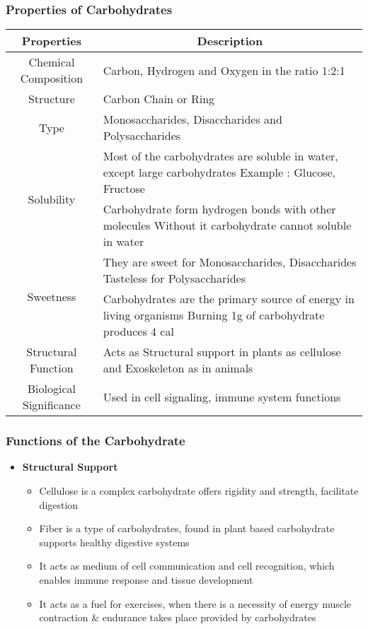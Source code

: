 \documentclass{article}
\begin{document}
	\subsubsection{Properties of Carbohydrates}
	\begin{center}
		\begin{tabular}{|c|p{}|} \hline
			Properties & \multicolumn{1}{c|}{Description} \\ \hline
			Chemical Composition & Carbon, Hydrogen and Oxygen in the ratio 1:2:1 \\ \hline
			Structure & Carbon Chain or Ring \\ \hline
			Type & Monosaccharides, Disaccharides and Polysaccharides \\ \hline
			\multirow{2}{*}{Solubility} & Most of the carbohydrates are soluble in water, except
				large carbohydrates \newline Example : Glucose, Fructose \\ \hline
			\multirow{2}{*}{Hydrogen Bonding} & Carbohydrate form hydrogen bonds with other
				molecules \newline Without it carbohydrate cannot soluble in water \\ \hline
			\multirow{2}{*}{Sweetness} & They are sweet for Monosaccharides, Disaccharides \newline
				Tasteless for Polysaccharides \\ \hline
			\multirow{2}{*}{Energy Source} & Carbohydrates are the primary source of energy in
				living organisms \newline Burning 1g of carbohydrate produces 4 cal \\ \hline
			Structural Function & Acts as Structural support in plants as cellulose and
				Exoskeleton as in animals \\ \hline
			Biological Significance & Used in cell signaling, immune system functions \\ \hline
		\end{tabular}
	\end{center}

	\subsubsection{Functions of the Carbohydrate}
	\begin{itemize}
		\item \textbf{Structural Support}
			\begin{itemize}
				\item Cellulose is a complex carbohydrate offers rigidity and strength,
					facilitate  digestion
				\item Fiber is a type of carbohydrates, found in plant based carbohydrate
					supports healthy digestive systems
				\item It acts as medium of cell communication and cell recognition, which
					enables immune response and tissue development
				\item It acts as a fuel for exercises, when there is a necessity of energy
					muscle contraction \& endurance takes place provided by carbohydrates
			\end{itemize}
	\end{itemize}
\end{document}

